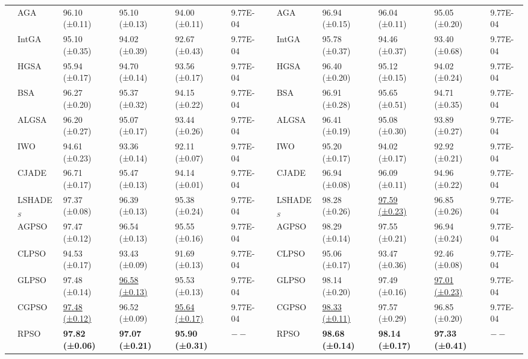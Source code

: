 \documentclass[review]{elsarticle}
\begin{document}
\begin{table}
\begin{adjustwidth}{-4.2cm}{}
{\begin{tabular}{l|lllll|c|lllll}
			\multirow{13}{*}{\rotatebox[origin=c]{90}{Wind scenario 3}} & AGA  & 96.10 (±0.11)  & 95.10 (±0.13)  & 94.00 (±0.11)  & 9.77E-04   &\multirow{13}{*}{\rotatebox[origin=c]{90}{Wind scenario 4}}& AGA  & 96.94 (±0.15)  & 96.04 (±0.11)  & 95.05 (±0.20)&9.77E-04    \\
			& IntGA  & 95.10 (±0.35)  & 94.02 (±0.39)  & 92.67 (±0.43)  &9.77E-04   & &IntGA  & 95.78 (±0.37)  & 94.46 (±0.37)  & 93.40 (±0.68) &9.77E-04   \\
			& HGSA  & 95.94 (±0.17)  & 94.70 (±0.14)  & 93.56 (±0.17)  &9.77E-04   & &HGSA  & 96.40 (±0.20)  & 95.12 (±0.15)  & 94.02 (±0.24)&9.77E-04    \\
			& BSA  & 96.27 (±0.20)  & 95.37 (±0.32)  & 94.15 (±0.22) &9.77E-04  & &BSA  & 96.91 (±0.28)  & 95.65 (±0.51)  & 94.71 (±0.35)&9.77E-04    \\
			& ALGSA  & 96.20 (±0.27)  & 95.07 (±0.17)  & 93.44 (±0.26)  &9.77E-04    & &ALGSA  & 96.41 (±0.19)  & 95.08 (±0.30)  & 93.89 (±0.27)&9.77E-04  \\
			& IWO  & 94.61 (±0.23)  & 93.36 (±0.14)  & 92.11 (±0.07)  &9.77E-04    & &IWO  & 95.20 (±0.17)  & 94.02 (±0.17)  & 92.92 (±0.21)&9.77E-04    \\
			& CJADE  & 96.71 (±0.17)  & 95.47 (±0.13)  & 94.14 (±0.01)  &9.77E-04    & &CJADE  & 96.94 (±0.08)  & 96.09 (±0.11)  & 94.96 (±0.22)&9.77E-04    \\
			& LSHADE$_S$  & 97.37 (±0.08)  & 96.39 (±0.13)  & 95.38 (±0.24)  &9.77E-04    & &LSHADE$_S$  & 98.28 (±0.26)  & \underline{97.59 (±0.23)}  & 96.85 (±0.26)&9.77E-04    \\
			& AGPSO  & 97.47 (±0.12)  & 96.54 (±0.13)  & 95.55 (±0.16)  &9.77E-04    & &AGPSO  & 98.29 (±0.14)  & 97.55 (±0.21)  & 96.94 (±0.24) &9.77E-04   \\
			& CLPSO  & 94.53 (±0.17)  & 93.43 (±0.09)  & 91.69 (±0.13)  &9.77E-04    & &CLPSO  & 95.06 (±0.17)  & 93.47 (±0.36)  & 92.46 (±0.08)&9.77E-04    \\
			& GLPSO  & 97.48 (±0.14)  & \underline{96.58 (±0.13)}  & 95.53 (±0.13)  &9.77E-04    & &GLPSO  & 98.14 (±0.20)  & 97.49 (±0.16)  & \underline{97.01 (±0.23)} &9.77E-04   \\
			& CGPSO  & \underline{97.48 (±0.12)}  & 96.52 (±0.09)  & \underline{95.64 (±0.17)}  &9.77E-04    & &CGPSO  & \underline{98.33 (±0.11)}  & 97.57 (±0.29)  & 96.85 (±0.20)&9.77E-04    \\
			& RPSO  & \textbf{97.82 (±0.06)}  & \textbf{97.07 (±0.21)}  & \textbf{95.90 (±0.31)}  &\quad$--$    & &RPSO  & \textbf{98.68 (±0.14)}  & \textbf{98.14 (±0.17)}  & \textbf{97.33 (±0.41)}&\quad$--$    \\\hline	
\end{tabular}}
\end{adjustwidth}
\end{table}
\end{document}
